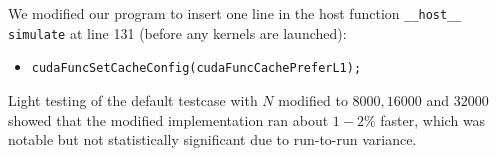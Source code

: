 \documentclass[12pt]{article}
\begin{document}
We modified our program to insert one line in the host function \texttt{\_\_host\_\_ simulate} at line 131 (before any kernels are launched):
\begin{itemize}
    \item \texttt{cudaFuncSetCacheConfig(cudaFuncCachePreferL1);}
\end{itemize}

Light testing of the default testcase with $N$ modified to $8000, 16000$ and $32000$ showed that the modified implementation ran about $1 - 2\%$ faster, which was notable but not statistically significant due to run-to-run variance.

\pagebreak



\end{document}
